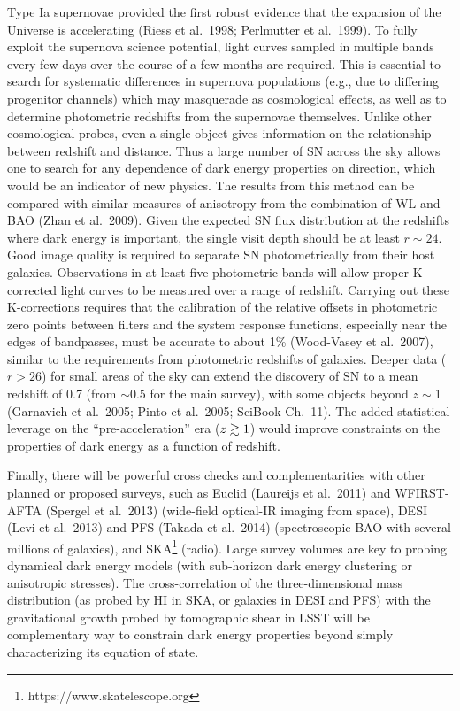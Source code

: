 \documentclass{emulateapj}
\begin{document}
Type Ia supernovae provided the first robust evidence that the expansion of the
Universe is accelerating (Riess et al.~1998; Perlmutter et al.~1999). To fully 
exploit the supernova science potential, light curves sampled in multiple
bands every few days over the course of a few months are required. This is
essential to search for systematic differences in supernova populations 
(e.g., due to differing progenitor channels) which 
may masquerade as cosmological effects, as well as to determine photometric 
redshifts from the supernovae themselves. Unlike other cosmological probes,
even a single object gives information on the relationship between
redshift and distance.  Thus a large 
number of SN across the sky allows one to search for any dependence 
of dark energy properties on direction, which 
would be an indicator of new physics. The results from this method can be compared 
with similar measures of anisotropy from the combination of WL and BAO
(Zhan et al.~2009).  
Given the expected SN flux distribution
at the redshifts where dark energy is important, the 
single visit depth should be at least $r\sim24$. Good image quality is
required to separate SN photometrically from 
their host galaxies. Observations in at least five photometric bands will allow
proper K-corrected light curves to be measured over a range of
redshift.  Carrying out these K-corrections requires that the 
calibration of the relative offsets in photometric zero points between filters and
the system response functions, especially near the edges of
bandpasses, must be accurate to about 1\% (Wood-Vasey et al.~2007),
similar to the requirements from photometric redshifts of galaxies. Deeper data 
($r>26$) for small areas of the sky can extend the discovery of SN to a mean 
redshift of 0.7 (from $\sim0.5$ for the main survey), with some objects beyond $z\sim$1
(Garnavich et al.~2005; Pinto et al.~2005; SciBook Ch.~11). The added statistical leverage 
on the ``pre-acceleration'' era ($z\gtrsim1$) would improve constraints on the properties of 
dark energy as a function of redshift.

Finally, there will be powerful cross checks and complementarities with other planned or 
proposed surveys, such as Euclid (Laureijs et al.~2011) and WFIRST-AFTA
(Spergel et al.~2013)
(wide-field optical-IR imaging from space),
DESI (Levi et al.~2013)
and PFS (Takada et al.~2014)
(spectroscopic BAO with several 
millions of galaxies), and SKA\footnote{https://www.skatelescope.org} (radio).
Large survey volumes are key to probing dynamical dark energy models (with sub-horizon 
dark energy clustering or anisotropic stresses). The cross-correlation
of the three-dimensional
mass distribution (as probed by HI in SKA, or galaxies in DESI and PFS) with the gravitational growth 
probed by tomographic shear in LSST will be complementary way to constrain dark energy 
properties beyond simply characterizing its equation of state. 
\end{document}
